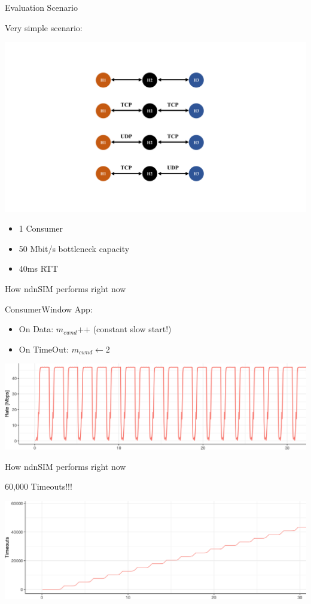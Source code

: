 \begin{frame}{Evaluation Scenario}

Very simple scenario: 

\includegraphics[width=\linewidth]{figs/Figure_3.pdf}

\begin{itemize}
\item 1 Consumer
\item 50 Mbit/s bottleneck capacity
\item 40ms RTT
\end{itemize}


\end{frame}


\begin{frame}{How ndnSIM performs right now}

ConsumerWindow App: 

\begin{itemize}
\item On Data: $m_{cwnd}$++ (constant slow start!)
\item On TimeOut: $m_{cwnd} \leftarrow 2$
\end{itemize}

\pause
\includegraphics[width=\linewidth]{figs/cons1.png}


\end{frame}

\begin{frame}{How ndnSIM performs right now}

60,000 Timeouts!!!

\includegraphics[width=\linewidth]{figs/cons2.png}


\end{frame}



